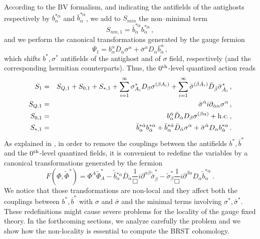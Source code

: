 \documentclass[a4paper,12pt]{article}
\begin{document}
According to the BV formalism, and indicating the antifields of the
antighosts respectively by $b^{*\alpha}_{\dot \alpha}$ and $\bar
b^{*\dot \alpha}_\alpha$, we add to $S_{min}$ the non--minimal term
\begin{equation}\label{Snm1}
S_{nm,1}= \bar b^{*\dot
\alpha}_\alpha b^{*\alpha}_{\dot \alpha}\,,  
\end{equation}
and we perform the canonical transformations generated by the gauge fermion
\begin{equation}\label{Psi1}
\Psi_1= b_\alpha^{\dot \alpha} \bar D_{\dot
\alpha}\sigma^\alpha +\bar
\sigma^{\dot \alpha}D_\alpha\bar b_{\dot \alpha}^\alpha \, , 
\end{equation}
which shifts $b^*,\sigma^*$ antifields of the antighost and of
$\sigma$ field, respectively (and the corresponding hermitian
counterparts). Thus, the $0^{\rm th}$-level quantized action reads
\begin{eqnarray}
S_1&=& S_{Q,1}+S_{0,1}+S_{*,1}+ 
\sum^{\infty}_{i=1}\sigma_{A_i}^* D_\beta \sigma^{(\beta A_i)} +  
\sum^{\infty}_{i= 1} \bar\sigma^{(\dot \beta \dot A_i)}  \bar D_{\dot
  \beta} \bar\sigma_{\dot A_i}^* 
\,, \nonumber\\
S_{Q,1}&=& \bar \sigma^{\dot
\alpha}i\partial_{\dot \alpha\alpha} \sigma^\alpha \,,\nonumber\\
S_{0,1}&=&
 b_\alpha^{\dot \alpha}\bar D_{\dot \alpha} D_\beta
\sigma^{(\beta\alpha)} + {\rm h.c.}\,,
\nonumber\\
S_{*,1}&=&  \bar b^{*\dot \alpha}_\alpha b^{*\alpha}_{\dot \alpha}+
\bar b^{*\dot \alpha}_\alpha \bar D_{\dot \alpha}  \sigma^\alpha +
 \bar \sigma^{\dot \alpha} D_\alpha b^{*\alpha}_{\dot \alpha} \, .
\label{Slevel1}
\end{eqnarray}
As explained in \cite{GPZ}, in order to remove the couplings between
the antifields $b^*, \bar b^*$ and the $0^{\rm th}$-level quantized
fields, it is convenient to redefine the variables by a canonical
transformations generated by the fermion
\begin{equation}
F(\Phi , \tilde\Phi^*) =\Phi^A \tilde\Phi^*_A -
\tilde{\bar b}{}^{*\dot \alpha}_\alpha \bar D_{\dot \alpha}\frac{1}{\Box}
i\partial^{\alpha\dot \beta}\tilde{\bar \sigma}^*_{\dot \beta}-
\tilde{\sigma}^*_{ \beta}\frac{1}{\Box}
i\partial^{\beta\dot\alpha} D_ \alpha\tilde{ b}^{* \alpha}_{\dot\alpha}\ .
\label{Fdiagsigma}
\end{equation}
We notice that those transformations are non-local and they affect
both the couplings between $b^*, \bar b^*$ with $\sigma$ and $\bar
\sigma$ and the minimal terms involving $\sigma^*, \bar \sigma^*$.
These redefinitions might cause severe problems for the locality of
the gauge fixed theory. In the forthcoming sections, we analyze
carefully the problem and we show how the non-locality is essential to
compute the BRST cohomology.
\end{document}
